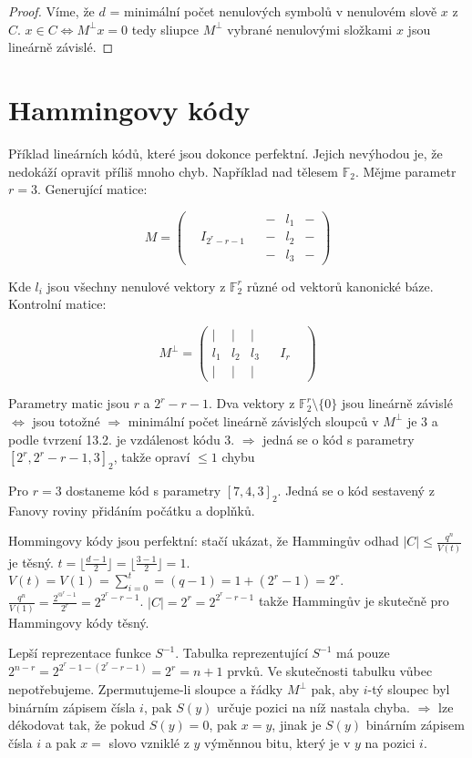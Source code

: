 \begin{proof}
	Víme, že $d$ = minimální počet nenulových symbolů v nenulovém slově $x$ z $C$. $x \in C \Leftrightarrow M^{\bot}x = 0$ tedy sliupce $M^{\bot}$ vybrané nenulovými složkami $x$ jsou lineárně závislé.
\end{proof}

\section{Hammingovy kódy}

Příklad lineárních kódů, které jsou dokonce perfektní. Jejich nevýhodou je, že nedokáží opravit příliš mnoho chyb. Například nad tělesem $\mathbb{F}_{2}$. Mějme parametr $r = 3$. Generující matice:

$$
M =
\begin{pmatrix}
	&  &  & - & l_{1} & - \\
	& I_{2^{r}-r-1} &  & - & l_{2} & - \\
	&  &  & - & l_{3} & -
\end{pmatrix}
$$

Kde $l_{i}$ jsou všechny nenulové vektory z $\mathbb{F}_{2}^{r}$ různé od vektorů kanonické báze. Kontrolní matice:

$$
M^{\bot} =
\begin{pmatrix}
	| & | & | &  &  &  \\
	l_{1} & l_{2} & l_{3} &  & I_{r} &  \\
	| & | & | &  &  & 
\end{pmatrix}
$$

Parametry matic jsou $r$ a $2^{r}-r-1$. Dva vektory z $\mathbb{F}_{2}^{r} \setminus \{0\}$ jsou lineárně závislé $\Leftrightarrow$ jsou totožné $\Rightarrow$ minimální počet lineárně závislých sloupců v $M^{\bot}$ je $3$ a podle tvrzení 13.2. je vzdálenost kódu $3$. $\Rightarrow$ jedná se o kód s parametry $[2^{r}, 2^{r}-r-1, 3]_{2}$, takže opraví $\leq 1$ chybu

\begin{prikl}
	Pro  $r=3$ dostaneme kód s parametry $[7,4,3]_{2}$. Jedná se o kód sestavený z Fanovy roviny přidáním počátku a doplňků.
\end{prikl}

Hommingovy kódy jsou perfektní: stačí ukázat, že Hammingův odhad $|C| \leq \frac{q^{n}}{V(t)}$ je těsný. $t = \lfloor \frac{d-1}{2} \rfloor = \lfloor \frac{3-1}{2} \rfloor = 1$. $V(t) = V(1) = \sum_{i=0}^{t} = (q-1) = 1 + (2^{r}-1) = 2^{r}$. $\frac{q^n}{V(1)} = \frac{2^{@^{r}-1}}{2^{r}} = 2^{2^{r}-r-1}$. $|C| = 2^{r} = 2^{2^{r}-r-1}$ takže Hammingův je skutečně pro Hammingovy kódy těsný.

Lepší reprezentace funkce $S^{-1}$. Tabulka reprezentující $S^{-1}$ má pouze $2^{n-r} = 2^{2^{r}-1-(2^{r}-r-1)} = 2^{r} = n + 1$ prvků. Ve skutečnosti tabulku vůbec nepotřebujeme. Zpermutujeme-li sloupce a řádky $M^{\bot}$ pak, aby $i$-tý sloupec byl binárním zápisem čísla $i$, pak $S(y)$ určuje pozici na níž nastala chyba. $\Rightarrow$ lze dékodovat tak, že pokud $S(y) = 0$, pak $x=y$, jinak je $S(y)$ binárním zápisem čísla $i$ a pak $x =$ slovo vzniklé z $y$ výměnnou bitu, který je v $y$ na pozici $i$.
